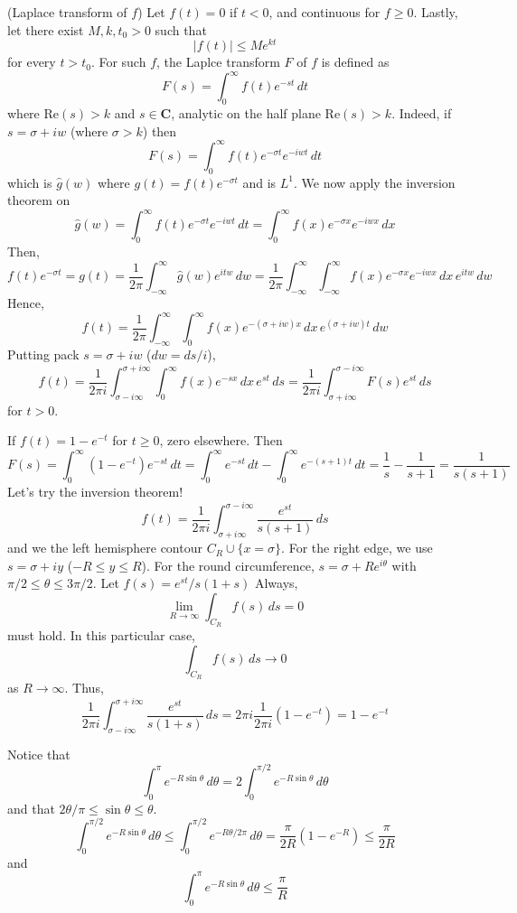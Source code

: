 \begin{defi}
(Laplace transform of $f$) Let $f(t)=0$ if $t<0$, and continuous for $f\geq 0$. Lastly, let there exist $M,k,t_{0}>0$ such that
\[|f(t)|\leq Me^{kt}\]
for every $t>t_{0}$. For such $f$, the Laplce transform $F$ of $f$ is defined as
\[F(s)=\int _{0}^{\infty }f(t)e^{-st}\,dt\]
where $\mathrm{Re}(s)> k$ and $s \in {\bm C}$, analytic on the half plane $\mathrm{Re}(s)>k$. Indeed, if $s=\sigma +iw$ (where $\sigma >k$) then
\[F(s)=\int _{0}^{\infty }f(t)e^{-\sigma t}e^{-iwt}\,dt\]
which is $\hat{g}(w)$ where $g(t)=f(t)e^{-\sigma t}$ and is $L^{1}$. We now apply the inversion theorem on 
\[\hat{g}(w)=\int _{0}^{\infty }f(t)e^{-\sigma t}e^{-iwt}\,dt=\int ^{\infty }_0 f(x)e^{-\sigma x}e^{-iwx}\,dx\]
Then, 
\[f(t)e^{-\sigma t}=g(t)=\dfrac{1}{2\pi }\int ^{\infty }_{-\infty }\hat{g}(w)e^{itw}\,dw=\dfrac{1}{2\pi }\int ^{\infty }_{-\infty }\int ^{\infty }_{-\infty }f(x)e^{-\sigma x}e^{-iwx}\,dx\,e^{itw}\,dw\]
Hence,
\[f(t)=\dfrac{1}{2\pi }\int _{-\infty }^{\infty }\int _{0}^{\infty }f(x)e^{-(\sigma +iw)x}\,dx\,e^{(\sigma +iw)t}\,dw\]
Putting pack $s=\sigma +iw$ ($dw=ds/i$),
\[f(t)=\dfrac{1}{2\pi i}\int _{\sigma -i\infty}^{\sigma +i\infty }\int ^{\infty }_{0}f(x)e^{-sx}\,dx\,e^{st}\,ds=\dfrac{1}{2\pi i}\int _{\sigma +i\infty }^{\sigma -i\infty }F(s)e^{st}\,ds\]
for $t>0$. 
\end{defi}
\vspace{2ex}
 \begin{ex}
 If $f(t)=1-e^{-t}$ for $t\geq 0$, zero elsewhere. Then 
 \[F(s)=\int _{0}^{\infty }(1-e^{-t})e^{-st}\,dt=\int _{0}^{\infty }e^{-st}\,dt-\int _{0}^{\infty }e^{-(s+1)t}\,dt=\dfrac{1}{s}-\dfrac{1}{s+1}=\dfrac{1}{s(s+1)}\]
Let's try the inversion theorem!
\[f(t)=\dfrac{1}{2\pi i}\int ^{\sigma -i\infty }_{\sigma +i\infty }\dfrac{e^{st}}{s(s+1)}\,ds\]
and we the left hemisphere contour $C_{R}\cup \{x=\sigma \}$. For the right edge, we use $s=\sigma +iy$ ($-R\leq y\leq R$). For the round circumference, $s=\sigma +Re^{i\theta }$ with $\pi /2\leq \theta \leq 3\pi /2$. Let $f(s)=e^{st}/s(1+s)$ Always, 
\[\lim _{R\rightarrow \infty }\int _{C_{R}}f(s)\,ds=0\]
must hold. In this particular case,
\[\int _{C_{R}}f(s)\,ds\rightarrow 0\]
as $R\rightarrow \infty $. Thus,
\[\dfrac{1}{2\pi i}\int ^{\sigma +i\infty }_{\sigma -i\infty }\dfrac{e^{st}}{s(1+s)}\,ds=2\pi i\dfrac{1}{2\pi i}(1-e^{-t})=1-e^{-t}\]
\end{ex}
\vspace{2ex}
\begin{recall}
Notice that
\[\int ^{\pi }_{0}e^{-R\sin \theta }\,d\theta =2\int ^{\pi /2}_{0}e^{-R\sin \theta }\,d\theta \]
and that $2\theta /\pi \leq \sin \theta \leq \theta $.
\[\int ^{\pi /2}_{0}e^{-R\sin \theta }\,d\theta \leq \int ^{\pi /2}_{0}e^{-R\theta /2\pi }\,d\theta =\dfrac{\pi }{2R}(1-e^{-R})\leq \dfrac{\pi }{2R}\]
and
\[\int ^{\pi }_{0}e^{-R\sin \theta }\,d\theta \leq \dfrac{\pi }{R}\]
\end{recall}
